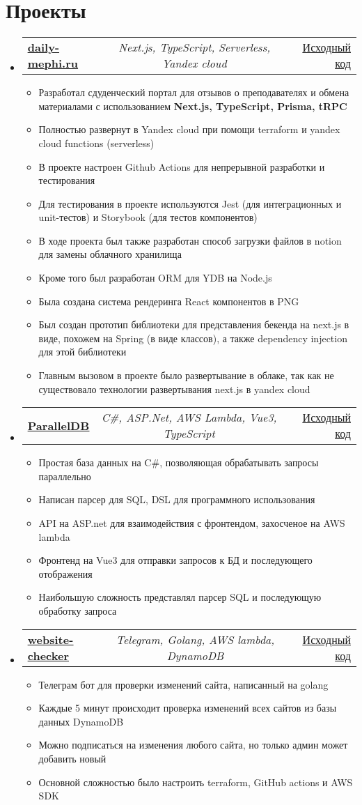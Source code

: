 \documentclass[a4paper,11pt]{article}
\makeatletter
\newcommand{\Csh}{C{\lserif\#}}
\newcommand{\resumeItem}[1]{
  \item\small{#1}
}
\newcommand{\resumeItemListStart}{\begin{itemize}[rightmargin=0.11in]}
\newcommand{\resumeItemListEnd}{\end{itemize}}
\newcommand{\resumeTrioHeading}[3]{
  \item\small{
    \begin{tabular*}{0.96\textwidth}[t]{
      l@{\extracolsep{\fill}}c@{\extracolsep{\fill}}r
    }
      \textbf{#1} & \textit{#2} & #3
    \end{tabular*}
  }
}
\newcommand{\resumeHeadingListStart}{
  \begin{itemize}[leftmargin=0.15in, label={}]
}
\newcommand{\resumeHeadingListEnd}{\end{itemize}}
\makeatother
\begin{document}
\section{Проекты}
  \resumeHeadingListStart{}
    \resumeTrioHeading{\href{https://daily-mephi.ru}{\uline{daily-mephi.ru}}}{Next.js, TypeScript, Serverless, Yandex cloud}{\href{https://github.com/MEPhI-Floppas/daily-mephi}{\uline{Исходный код}}}
      \resumeItemListStart{}
        \resumeItem{Разработал сдуденческий портал для отзывов о преподавателях и обмена материалами с использованием \textbf{Next.js, TypeScript, Prisma, tRPC}}
        \resumeItem{Полностью развернут в Yandex cloud при помощи terraform и yandex cloud functions (serverless)}
        \resumeItem{В проекте настроен Github Actions для непрерывной разработки и тестирования}
        \resumeItem{Для тестирования в проекте используются Jest (для интеграционных и unit-тестов) и Storybook (для тестов компонентов)}
        \resumeItem{В ходе проекта был также разработан способ загрузки файлов в notion для замены облачного хранилища}
        \resumeItem{Кроме того был разработан ORM для YDB на Node.js}
        \resumeItem{Была создана система рендеринга React компонентов в PNG}
        \resumeItem{Был создан прототип библиотеки для представления бекенда на next.js в виде, похожем на Spring (в виде классов), а также dependency injection для этой библиотеки}
        \resumeItem{Главным вызовом в проекте было развертывание в облаке, так как не существовало технологии развертывания next.js в yandex cloud}
      \resumeItemListEnd{}

      \resumeTrioHeading{\href{https://paralleldb.vercel.app/}{\uline{ParallelDB}}}{\Csh{}, ASP.Net, AWS Lambda, Vue3, TypeScript}{\href{https://github.com/PotatoHD404/ParallelDB}{\uline{Исходный код}}}
      \resumeItemListStart{}
        \resumeItem{Простая база данных на \Csh{}, позволяющая обрабатывать запросы параллельно}
        \resumeItem{Написан парсер для SQL, DSL для программного использования}
        \resumeItem{API на ASP.net для взаимодействия с фронтендом, захосченое на AWS lambda}
        \resumeItem{Фронтенд на Vue3 для отправки запросов к БД и последующего отображения}
        \resumeItem{Наибольшую сложность представлял парсер SQL и последующую обработку запроса}
      \resumeItemListEnd{}
    \resumeTrioHeading{\href{https://t.me/potatohd_checker_bot}{\uline{website-checker}}}{Telegram, Golang, AWS lambda, DynamoDB}{\href{https://github.com/PotatoHD404/website-checker-bot}{\uline{Исходный код}}}
      \resumeItemListStart{}
        \resumeItem{Телеграм бот для проверки изменений сайта, написанный на golang}
        \resumeItem{Каждые 5 минут происходит проверка изменений всех сайтов из базы данных DynamoDB}
        \resumeItem{Можно подписаться на изменения любого сайта, но только админ может добавить новый}
        \resumeItem{Основной сложностью было настроить terraform, GitHub actions и AWS SDK}
      \resumeItemListEnd{}
  \resumeHeadingListEnd{}
\end{document}
